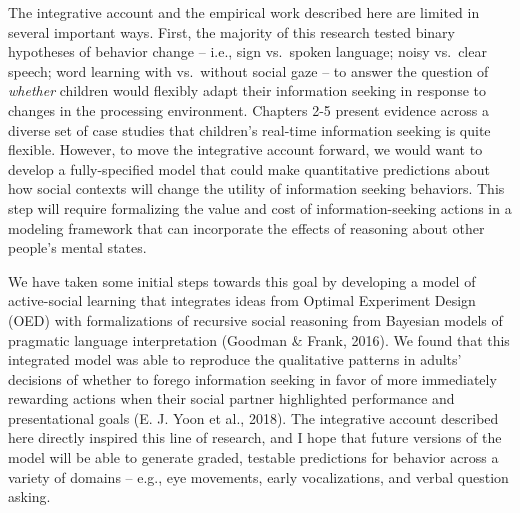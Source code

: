 \documentclass[oneside]{report}
\begin{document}
The integrative account and the empirical work described here are
limited in several important ways. First, the majority of this research
tested binary hypotheses of behavior change -- i.e., sign vs.~spoken
language; noisy vs.~clear speech; word learning with vs.~without social
gaze -- to answer the question of \emph{whether} children would flexibly
adapt their information seeking in response to changes in the processing
environment. Chapters 2-5 present evidence across a diverse set of case
studies that children's real-time information seeking is quite flexible.
However, to move the integrative account forward, we would want to
develop a fully-specified model that could make quantitative predictions
about how social contexts will change the utility of information seeking
behaviors. This step will require formalizing the value and cost of
information-seeking actions in a modeling framework that can incorporate
the effects of reasoning about other people's mental states.

We have taken some initial steps towards this goal by developing a model
of active-social learning that integrates ideas from Optimal Experiment
Design (OED) with formalizations of recursive social reasoning from
Bayesian models of pragmatic language interpretation (Goodman \& Frank,
2016). We found that this integrated model was able to reproduce the
qualitative patterns in adults' decisions of whether to forego
information seeking in favor of more immediately rewarding actions when
their social partner highlighted performance and presentational goals
(E. J. Yoon et al., 2018). The integrative account described here
directly inspired this line of research, and I hope that future versions
of the model will be able to generate graded, testable predictions for
behavior across a variety of domains -- e.g., eye movements, early
vocalizations, and verbal question asking.
\end{document}
